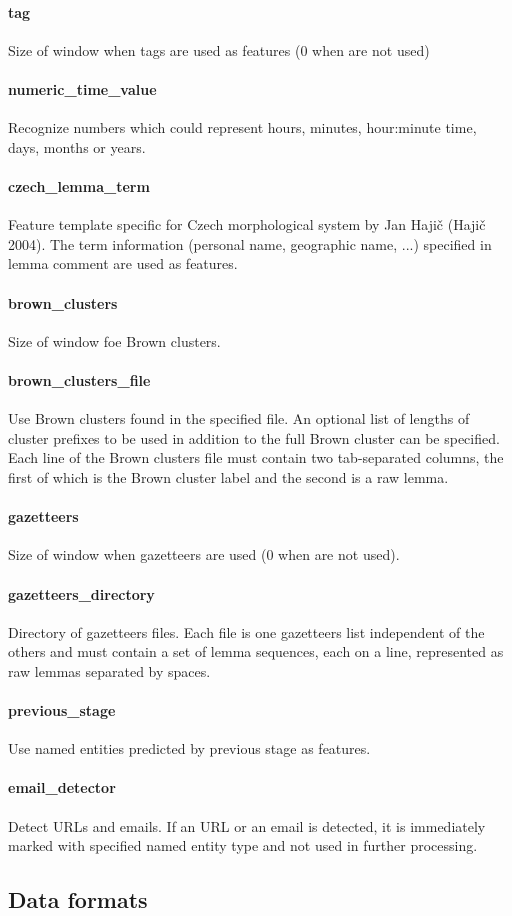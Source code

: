 \paragraph{tag}
Size of window when tags are used as features (0 when are not used)

\paragraph{numeric\_time\_value}
Recognize numbers which could represent hours, minutes, hour:minute time, days,
months or years.

\paragraph{czech\_lemma\_term}
Feature template specific for Czech morphological system by Jan Hajič (Hajič 2004).
The term information (personal name, geographic name, ...) specified in lemma comment
are used as features.

\paragraph{brown\_clusters}
Size of window foe Brown clusters.

\paragraph{brown\_clusters\_file}
Use Brown clusters found in the specified file. An optional list of lengths of
cluster prefixes to be used in addition to the full Brown cluster can be specified.
Each line of the Brown clusters file must contain two tab-separated columns,
the first of which is the Brown cluster label and the second is a raw lemma.

\paragraph{gazetteers}
Size of window when gazetteers are used (0 when are not used).

\paragraph{gazetteers\_directory}
Directory of gazetteers files. Each file is one gazetteers list independent
of the others and must contain a set of lemma sequences, each on a line,
represented as raw lemmas separated by spaces.

\paragraph{previous\_stage}
Use named entities predicted by previous stage as features.

\paragraph{email\_detector}
Detect URLs and emails. If an URL or an email is detected, it is immediately marked
with specified named entity type and not used in further processing.

\subsection{Data formats}


